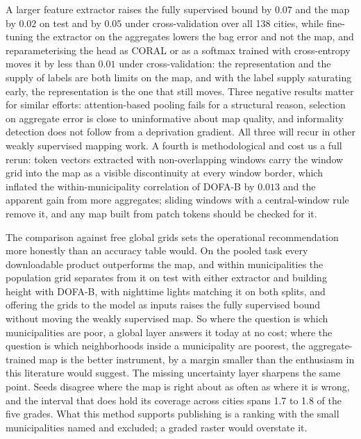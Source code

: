 \documentclass[11pt]{article}
\begin{document}
A larger feature extractor raises the fully supervised bound by $0.07$
and the map by $0.02$ on test and by $0.05$ under cross-validation over all 138 cities,
while fine-tuning the extractor on the aggregates lowers the bag error and not the map,
and reparameterising the head as CORAL or as a softmax trained with cross-entropy moves
it by less than $0.01$ under cross-validation: the representation and the supply of
labels are both limits on the map, and with the
label supply saturating early, the representation is the one that still moves. Three
negative results matter for similar efforts: attention-based pooling fails for a
structural reason, selection on aggregate error is close to uninformative about map
quality, and informality detection does not follow from a deprivation gradient. All
three will recur in other weakly supervised mapping work. A fourth is methodological
and cost us a full rerun: token vectors extracted with non-overlapping windows carry
the window grid into the map as a visible discontinuity at every window border, which
inflated the within-municipality
correlation of DOFA-B by $0.013$ and the apparent gain from more aggregates; sliding
windows with a central-window rule remove it, and any map built from patch tokens
should be checked for it.

The comparison against free global grids sets the operational recommendation more
honestly than an accuracy table would. On the pooled task every downloadable product
outperforms the map, and within municipalities the population grid separates from it
on test with either extractor and building height with DOFA-B, with nighttime lights
matching it on both splits, and offering the grids to the model as inputs raises the
fully supervised bound without moving the weakly supervised map. So where the question
is which municipalities are poor, a global layer answers it today at no cost; where the
question is which neighborhoods inside a municipality are poorest, the aggregate-trained
map is the better instrument, by a margin smaller than the enthusiasm in this literature
would suggest. The missing uncertainty layer sharpens the same point. Seeds disagree
where the map is right about as often as where it is wrong, and the interval that does
hold its coverage across cities spans 1.7 to 1.8 of the five grades. What this method supports
publishing is a ranking with the small municipalities named and excluded; a graded
raster would overstate it.
\end{document}
